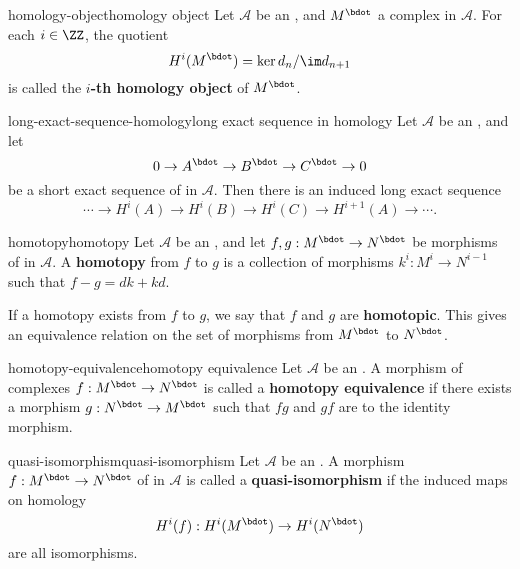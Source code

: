 \begin{topic}{homology-object}{homology object}
    Let $\mathcal{A}$ be an , and $M^\bdot$ a complex in $\mathcal{A}$. For each $i \in \ZZ$, the quotient
    \[ H^i(M^\bdot) = \ker d_n / \im d_{n + 1} \]
    is called the \textbf{$i$-th homology object} of $M^\bdot$.
\end{topic}

\begin{topic}{long-exact-sequence-homology}{long exact sequence in homology}
    Let $\mathcal{A}$ be an , and let
    \[ 0 \rightarrow A^\bdot \rightarrow B^\bdot \rightarrow C^\bdot \rightarrow 0 \]
    be a short exact sequence of  in $\mathcal{A}$. Then there is an induced long exact sequence
    \[ \cdots \rightarrow H^i(A) \rightarrow H^i(B) \rightarrow H^i(C) \rightarrow H^{i + 1}(A) \rightarrow \cdots . \]
\end{topic}

\begin{topic}{homotopy}{homotopy}
    Let $\mathcal{A}$ be an , and let $f, g : M^\bdot \to N^\bdot$ be morphisms of  in $\mathcal{A}$. A \textbf{homotopy} from $f$ to $g$ is a collection of morphisms $k^i : M^i \to N^{i - 1}$ such that $f - g = dk + kd$.
    
    If a homotopy exists from $f$ to $g$, we say that $f$ and $g$ are \textbf{homotopic}. This gives an equivalence relation on the set of morphisms from $M^\bdot$ to $N^\bdot$.
\end{topic}

\begin{topic}{homotopy-equivalence}{homotopy equivalence}
    Let $\mathcal{A}$ be an . A morphism of complexes $f : M^\bdot \to N^\bdot$ is called a \textbf{homotopy equivalence} if there exists a morphism $g : N^\bdot \to M^\bdot$ such that $fg$ and $gf$ are  to the identity morphism.
\end{topic}

\begin{topic}{quasi-isomorphism}{quasi-isomorphism}
    Let $\mathcal{A}$ be an . A morphism $f : M^\bdot \to N^\bdot$ of  in $\mathcal{A}$ is called a \textbf{quasi-isomorphism} if the induced maps on homology
    \[ H^i(f) : H^i(M^\bdot) \to H^i(N^\bdot) \]
    are all isomorphisms.
\end{topic}

